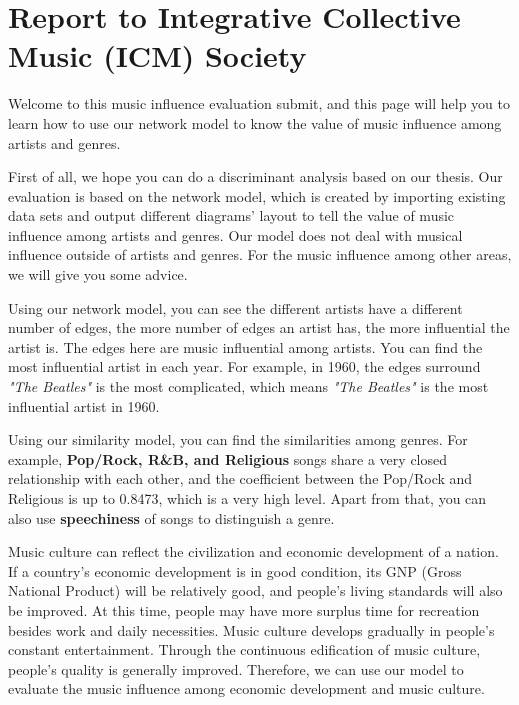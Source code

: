 \documentclass[12pt]{article}
\begin{document}
\clearpage
\section{Report to Integrative Collective Music (ICM) Society}

Welcome to this music influence evaluation submit, and this page will help you to learn how to use our network model to know the value of music influence among artists and genres. 

First of all, we hope you can do a discriminant analysis based on our thesis. Our evaluation is based on the network model, which is created by importing existing data sets and output different diagrams’ layout to tell the value of music influence among artists and genres. Our model does not deal with musical influence outside of artists and genres. For the music influence among other areas, we will give you some advice.

Using our network model, you can see the different artists have a different number of edges, the more number of edges an artist has, the more influential the artist is. The edges here are music influential among artists. You can find the most influential artist in each year. For example, in 1960, the edges surround \emph{"The Beatles"}  is the most complicated, which means \emph{"The Beatles"} is the most influential artist in 1960.

Using our similarity model, you can find the similarities among genres. For example, \textbf{Pop/Rock, R\&B, and Religious} songs share a very closed relationship with each other, and the coefficient between the Pop/Rock and Religious is up to 0.8473, which is a very high level. Apart from that, you can also use \textbf{speechiness} of songs to distinguish a genre.

Music culture\cite{article13} can reflect the civilization and economic development of a nation. If a country’s economic development is in good condition, its GNP (Gross National Product) \cite{article14} will be relatively good, and people’s living standards will also be improved. At this time, people may have more surplus time for recreation besides work and daily necessities. Music culture develops gradually in people’s constant entertainment. Through the continuous edification of music culture, people’s quality is generally improved. Therefore, we can use our model to evaluate the music influence among economic development and music culture.
\end{document}
